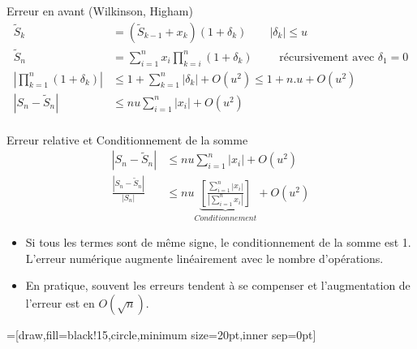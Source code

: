 \documentclass{beamer}
\begin{document}
\begin{frame}{Erreur en avant (Wilkinson, Higham)}
    \begin{align*}
        \widetilde{S}_k                            & = (\widetilde{S}_{k-1}+x_k)(1+\delta_k) \qquad |\delta_k| \le u                                 \\
        \widetilde{S}_n                            & = \sum_{i=1}^n x_i \prod_{k=i}^{n}(1+\delta_k) \qquad \text { récursivement avec } \delta_1 = 0 \\
        \left| \prod_{k=1}^n{(1+\delta_k)} \right| & \le 1 + \sum_{k=1}^n{|\delta_k|} + O(u^2) \le 1 + n.u + O(u^2)                                  \\
        \left|S_n - \widetilde{S}_n \right|        & \le nu\sum_{i=1}^n{|x_i|} + O(u^2)                                                              \\
    \end{align*}
\end{frame}

\begin{frame}{Erreur relative et Conditionnement de la somme}
    \begin{align*}
        \left|S_n - \widetilde{S}_n \right|               & \le nu\sum_{i=1}^n{|x_i|} + O(u^2)                                                                                           \\
        \frac{\left|S_n - \widetilde{S}_n \right|}{|S_n|} & \le   nu \underbrace{\left[\frac{\sum_{i=1}^n{|x_i|}}{ \left|\sum_{i=1}^n{x_i} \right|} \right]}_{Conditionnement}  + O(u^2)
    \end{align*}

    \begin{itemize}
        \item Si tous les termes sont de même signe, le conditionnement de la somme est 1.
              L'erreur numérique augmente linéairement avec le nombre d'opérations.
        \item En pratique, souvent les erreurs tendent à se compenser et l'augmentation de l'erreur est en $O(\sqrt{n})$.
    \end{itemize}
\end{frame}

=[draw,fill=black!15,circle,minimum size=20pt,inner sep=0pt]
\end{document}
